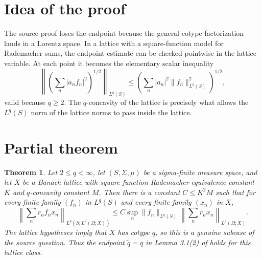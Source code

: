\documentclass[11pt]{amsart}
\newtheorem{theorem}{Theorem}
\begin{document}
\section*{Idea of the proof}

The source proof loses the endpoint because the general cotype factorization
lands in a Lorentz space.  In a lattice with a square-function model for
Rademacher sums, the endpoint estimate can be checked pointwise in the lattice
variable.  At each point it becomes the elementary scalar inequality
\[
\left\|\left(\sum_n |a_n f_n|^2\right)^{1/2}\right\|_{L^q(S)}
\leq
\left(\sum_n |a_n|^2 \|f_n\|_{L^q(S)}^2\right)^{1/2},
\]
valid because $q\geq 2$.  The $q$-concavity of the lattice is precisely what
allows the $L^q(S)$ norm of the lattice norms to pass inside the lattice.

\section*{Partial theorem}

\begin{theorem}
Let $2\le q<\infty$, let $(S,\Sigma,\mu)$ be a sigma-finite measure space, and
let $X$ be a Banach lattice with square-function Rademacher equivalence
constant $K$ and $q$-concavity constant $M$.  Then there is a constant
$C\le K^2M$ such that for every finite family $(f_n)$ in $L^q(S)$ and every
finite family $(x_n)$ in $X$,
\[
\left\|\sum_n r_n f_n x_n\right\|_{L^q(S;L^2(\Omega;X))}
\leq
C\sup_n\|f_n\|_{L^q(S)}
\left\|\sum_n r_n x_n\right\|_{L^2(\Omega;X)}.
\]
The lattice hypotheses imply that $X$ has cotype $q$, so this is a genuine
subcase of the source question.  Thus the endpoint $\widetilde q=q$ in
Lemma 3.1(2) of \cite{HV2008} holds for this lattice class.
\end{theorem}
\end{document}
